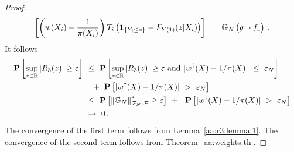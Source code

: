 \begin{proof}
\begin{align*}
    \left[ 
    \left( 
    w(X_i) 
    -
    \frac{1}{\pi(X_i)}
    \right)
    T_i
    \left( 
    \mathbf{1}_{\left\{ Y_i \le z \right\}}
    -
  F_{Y(1)}(z|X_i)
    \right)
    \right]
    \ 
    =
    \ 
    \G_N
    \left( 
      g^\dagger
      \cdot
      f_z
    \right)
    \,.
  \end{align*}
  It follows
\begin{align*}
    \P
    \left[ 
      \sup_{z\in\R}
     | 
    R_3(z)
    |
      \ge
      \varepsilon
    \right]
    &
    \ 
    \le
    \ 
    \P
    \left[ 
      \sup_{z\in\R}
     | 
    R_3(z)
    |
      \ge
      \varepsilon
      \ 
      \text{and}
      \ 
    | 
    w^\dagger(X)- 1/\pi(X)
    |
    \ 
    \le
    \ 
    \varepsilon_N
    \right]
    \\
    &
    \quad
    +
    \ 
    \P
    \left[ 
    | 
    w^\dagger(X)- 1/\pi(X)
    |
    \ 
    >
    \ 
    \varepsilon_N
    \right]
    \\
    &
    \ 
    \le
    \ 
    \P
    \left[ 
      \norm{\G_N}^*_{\mathcal{F}_N\cdot\mathcal{F}}
      \ge
      \varepsilon
    \right]
    \ 
    +
    \ 
    \ 
    \P
    \left[ 
    | 
    w^\dagger(X)- 1/\pi(X)
    |
    \ 
    >
    \ 
    \varepsilon_N
    \right]
    \\
    &
    \ 
    \to
    \ 
    0
    \,.
\end{align*}
The convergence of the first term follows from
Lemma~\ref{aa:r3:lemma:1}.
The convergence of the second term follows from
Theorem~\ref{aa:weights:th}.

\end{proof}

